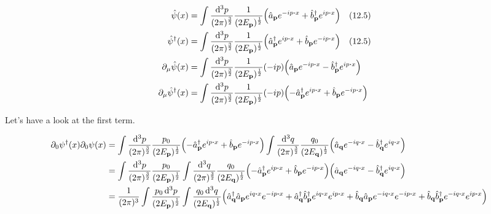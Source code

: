 \documentclass{article}
\begin{document}
\begin{align*}
    \hat{\psi}(x)                       & =\int \frac{\dd[3]{p}}{(2\pi)^\frac{3}{2}}  \frac{1}{(2E_{\vb{p}})^{\frac{1}{2}}}  \pqty{\hat{a}_{\vb{p}}e^{-ip\vdot x}+\hat{b}^\dagger_{\vb{p}}e^{ip\vdot x}} \qq{(12.5)} \\
    \hat{\psi}^\dagger (x)              & =\int \frac{\dd[3]{p}}{(2\pi)^\frac{3}{2}}  \frac{1}{(2E_{\vb{p}})^{\frac{1}{2}}}  \pqty{\hat{a}^\dagger_{\vb{p}}e^{ip\vdot x}+\hat{b}_{\vb{p}}e^{-ip\vdot x}} \qq{(12.5)} \\
    \partial_\mu \hat{\psi}(x)          & =\int \frac{\dd[3]{p}}{(2\pi)^\frac{3}{2}}  \frac{1}{(2E_{\vb{p}})^{\frac{1}{2}}} (-ip) \pqty{\hat{a}_{\vb{p}}e^{-ip\vdot x}-\hat{b}^\dagger_{\vb{p}}e^{ip\vdot x}}        \\
    \partial_\mu \hat{\psi}^\dagger (x) & =\int \frac{\dd[3]{p}}{(2\pi)^\frac{3}{2}}  \frac{1}{(2E_{\vb{p}})^{\frac{1}{2}}} (-ip) \pqty{-\hat{a}^\dagger_{\vb{p}}e^{ip\vdot x}+\hat{b}_{\vb{p}}e^{-ip\vdot x}}       \\
\end{align*}

Let's have a look at the first term.

\begin{align*}
    \partial_0 \psi^\dagger (x)\partial_0 \psi(x) & =\int \frac{\dd[3]{p}}{(2\pi)^\frac{3}{2}}  \frac{p_0}{(2E_{\vb{p}})^{\frac{1}{2}}}\pqty{-\hat{a}^\dagger_{\vb{p}}e^{ip\vdot x}+\hat{b}_{\vb{p}}e^{-ip\vdot x}}\int \frac{\dd[3]{q}}{(2\pi)^\frac{3}{2}}  \frac{q_0}{(2E_{\vb{q}})^{\frac{1}{2}}}  \pqty{\hat{a}_{\vb{q}}e^{-iq\vdot x}-\hat{b}^\dagger_{\vb{q}}e^{iq\vdot x}}                                                                                              \\
                                                  & =\int \frac{\dd[3]{p}}{(2\pi)^\frac{3}{2}}  \frac{p_0}{(2E_{\vb{p}})^{\frac{1}{2}}}\int \frac{\dd[3]{q}}{(2\pi)^\frac{3}{2}}  \frac{q_0}{(2E_{\vb{q}})^{\frac{1}{2}}}\pqty{-\hat{a}^\dagger_{\vb{p}}e^{ip\vdot x}+\hat{b}_{\vb{p}}e^{-ip\vdot x}}\pqty{\hat{a}_{\vb{q}}e^{-iq\vdot x}-\hat{b}^\dagger_{\vb{q}}e^{iq\vdot x}}                                                                                                \\
                                                  & =\frac{1}{(2\pi)^3}\int   \frac{p_0 \dd[3]{p}}{(2E_{\vb{p}})^{\frac{1}{2}}}\int   \frac{q_0 \dd[3]{q}}{(2E_{\vb{q}})^{\frac{1}{2}}}  \pqty{\hat{a}^\dagger_{\vb{q}}\hat{a}_{\vb{p}}e^{iq\vdot x}e^{-ip\vdot x}+\hat{a}^\dagger_{\vb{q}}\hat{b}^\dagger_{\vb{p}}e^{iq\vdot x}e^{ip\vdot x}+\hat{b}_{\vb{q}}\hat{a}_{\vb{p}}e^{-iq\vdot x}e^{-ip\vdot x}+\hat{b}_{\vb{q}}\hat{b}^\dagger_{\vb{p}}e^{-iq\vdot x}e^{ip\vdot x}} \\
\end{align*}
\end{document}
